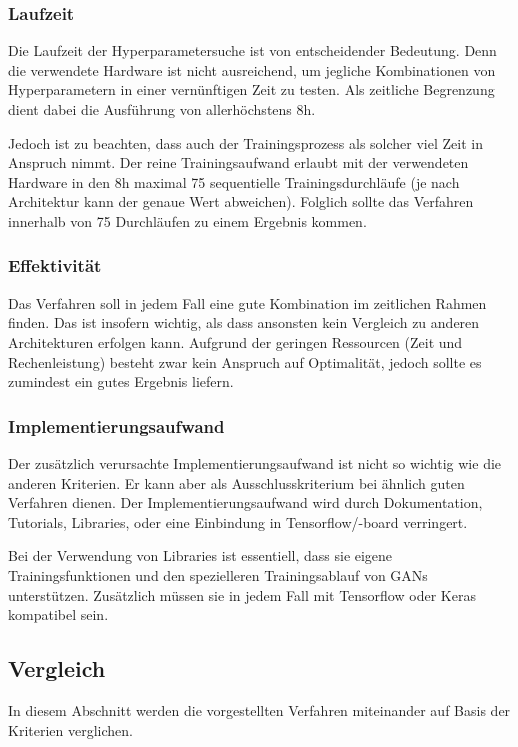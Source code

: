 \subsubsection{Laufzeit}
Die Laufzeit der Hyperparametersuche ist von entscheidender Bedeutung.
Denn die verwendete Hardware ist nicht ausreichend, um jegliche Kombinationen von Hyperparametern in einer vernünftigen Zeit zu testen.
Als zeitliche Begrenzung dient dabei die Ausführung von allerhöchstens 8h.
\newline

Jedoch ist zu beachten, dass auch der Trainingsprozess als solcher viel Zeit in Anspruch nimmt.
Der reine Trainingsaufwand erlaubt mit der verwendeten Hardware in den 8h maximal 75 sequentielle Trainingsdurchläufe (je nach Architektur kann der genaue Wert abweichen).
Folglich sollte das Verfahren innerhalb von 75 Durchläufen zu einem Ergebnis kommen.

\subsubsection{Effektivität}
Das Verfahren soll in jedem Fall eine gute Kombination im zeitlichen Rahmen finden.
Das ist insofern wichtig, als dass ansonsten kein Vergleich zu anderen Architekturen erfolgen kann.
Aufgrund der geringen Ressourcen (Zeit und Rechenleistung) besteht zwar kein Anspruch auf Optimalität, jedoch sollte es zumindest ein gutes Ergebnis liefern.

\subsubsection{Implementierungsaufwand}
Der zusätzlich verursachte Implementierungsaufwand ist nicht so wichtig wie die anderen Kriterien.
Er kann aber als Ausschlusskriterium bei ähnlich guten Verfahren dienen.
Der Implementierungsaufwand wird durch Dokumentation, Tutorials, Libraries, oder eine Einbindung in Tensorflow/-board verringert.

Bei der Verwendung von Libraries ist essentiell, dass sie eigene Trainingsfunktionen und den spezielleren Trainingsablauf von GANs unterstützen.
Zusätzlich müssen sie in jedem Fall mit Tensorflow oder Keras kompatibel sein.

\subsection{Vergleich}
In diesem Abschnitt werden die vorgestellten Verfahren miteinander auf Basis der Kriterien verglichen.

